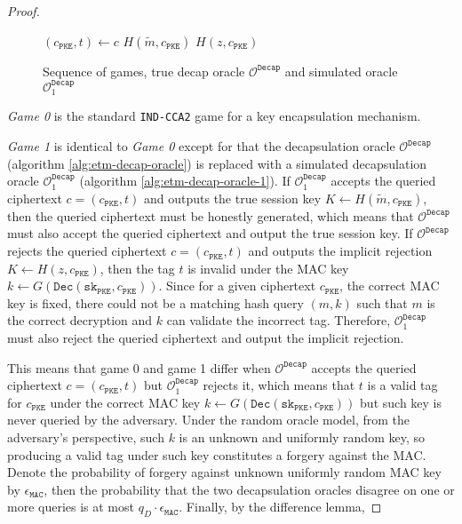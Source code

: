 \documentclass[floatrow,journal=tches,submission]{iacrtrans}
\newcommand{\pke}{\texttt{PKE}}
\newcommand{\decrypt}{\texttt{Dec}}
\newcommand{\decap}{\texttt{Decap}}
\newcommand{\mac}{\texttt{MAC}}
\newcommand{\sk}{\texttt{sk}}
\begin{document}
\begin{proof}
\begin{figure}[H]
\begin{algorithm}[H]
            \caption{$\mathcal{O}^\decap_1(c)$}\label{alg:etm-decap-oracle-1}
            \begin{algorithmic}[1]
                \State $(c_\pke, t) \leftarrow c$
                \If{$\exists (\tilde{m}, \tilde{k}) \in \mathcal{L}^G 
                    : \decrypt(\sk_\pke, c_\pke) = \tilde{m} 
                    \land \mac(\tilde{k}, c_\pke) = t$}
                    \State \Return $H(\tilde{m}, c_\pke)$
                \EndIf
                \State \Return $H(z, c_\pke)$
            \end{algorithmic}
        \end{algorithm}
        \caption{Sequence of games, true decap oracle $\mathcal{O}^\decap$ and simulated oracle $\mathcal{O}^\decap_1$}\label{fig:sequence-of-games}
    \end{figure}

    \emph{Game 0} is the standard \texttt{IND-CCA2} game for a key encapsulation mechanism.

    \emph{Game 1} is identical to \emph{Game 0} except for that the decapsulation oracle $\mathcal{O}^\decap$ (algorithm \ref{alg:etm-decap-oracle}) is replaced with a simulated decapsulation oracle $\mathcal{O}^\decap_1$ (algorithm \ref{alg:etm-decap-oracle-1}). If $\mathcal{O}^\decap_1$ accepts the queried ciphertext $c = (c_\pke, t)$ and outputs the true session key $K \leftarrow H(\tilde{m}, c_\pke)$, then the queried ciphertext must be honestly generated, which means that $\mathcal{O}^\decap$ must also accept the queried ciphertext and output the true session key. If $\mathcal{O}^\decap$ rejects the queried ciphertext $c = (c_\pke, t)$ and outputs the implicit rejection $K \leftarrow H(z, c_\pke)$, then the tag $t$ is invalid under the MAC key $k \leftarrow G(\decrypt(\sk_\pke, c_\pke))$. Since for a given ciphertext $c_\pke$, the correct MAC key is fixed, there could not be a matching hash query $(m, k)$ such that $m$ is the correct decryption and $k$ can validate the incorrect tag. Therefore, $\mathcal{O}^\decap_1$ must also reject the queried ciphertext and output the implicit rejection.

    This means that game 0 and game 1 differ when $\mathcal{O}^\decap$ accepts the queried ciphertext $c = (c_\pke, t)$ but $\mathcal{O}^\decap_1$ rejects it, which means that $t$ is a valid tag for $c_\pke$ under the correct MAC key $k \leftarrow G(\decrypt(\sk_\pke, c_\pke))$ but such key is never queried by the adversary. Under the random oracle model, from the adversary's perspective, such $k$ is an unknown and uniformly random key, so producing a valid tag under such key constitutes a forgery against the MAC. Denote the probability of forgery against unknown uniformly random MAC key by $\epsilon_\mac$, then the probability that the two decapsulation oracles disagree on one or more queries is at most $q_D \cdot \epsilon_\mac$. Finally, by the difference lemma,


\end{proof}
\end{document}
